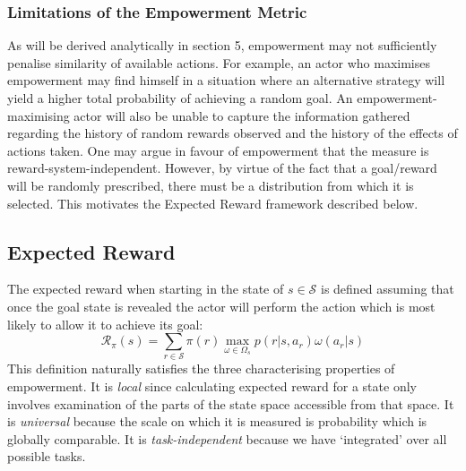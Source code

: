\documentclass{article}
\newcommand{\Ss}{\mathcal{S}}
\newcommand{\Rr}{\mathcal{R}}
\begin{document}
\subsubsection{Limitations of the Empowerment Metric}
As will be derived analytically in section 5, empowerment may not sufficiently penalise similarity of available actions.
For example, an actor who maximises empowerment may find himself in a situation where an alternative strategy will yield a higher total probability of achieving a random goal.
An empowerment-maximising actor will also be unable to capture the information gathered regarding the history of random rewards observed and the history of the effects of actions taken.
One may argue in favour of empowerment that the measure is reward-system-independent.
However, by virtue of the fact that a goal/reward will be randomly prescribed, there must be a distribution from which it is selected. This motivates the Expected Reward framework described below.

\subsection{Expected Reward}
The expected reward when starting in the state of $s\in\mathcal{S}$ is defined assuming that once the goal state is revealed the actor will perform the action which is most likely to allow it to achieve its goal:
\[\Rr_\pi(s) = \sum_{r\in\Ss} \pi(r) \max_{\omega\in\Omega_s} p(r|s,a_r)\omega(a_r|s)\]
This definition naturally satisfies the three characterising properties of empowerment. It is \textit{local} since calculating expected reward for a state only involves examination of the parts of the state space accessible from that space. It is \textit{universal} because the scale on which it is measured is probability which is globally comparable. It is \textit{task-independent} because we have `integrated' over all possible tasks.
\end{document}
